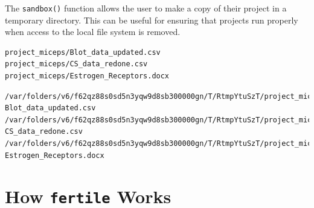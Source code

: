 \documentclass[12pt,twoside]{reedthesis}
\newenvironment{Shaded}{\begin{snugshade}}{\end{snugshade}}
\newcommand{\KeywordTok}[1]{\textcolor[rgb]{0.13,0.29,0.53}{\textbf{#1}}}
\newcommand{\DecValTok}[1]{\textcolor[rgb]{0.00,0.00,0.81}{#1}}
\newcommand{\StringTok}[1]{\textcolor[rgb]{0.31,0.60,0.02}{#1}}
\newcommand{\OperatorTok}[1]{\textcolor[rgb]{0.81,0.36,0.00}{\textbf{#1}}}
\newcommand{\NormalTok}[1]{#1}
\begin{document}
The \texttt{sandbox()} function allows the user to make a copy of their
project in a temporary directory. This can be useful for ensuring that
projects run properly when access to the local file system is removed.

\footnotesize
\begin{Shaded}
\end{Shaded}
\begin{verbatim}
project_miceps/Blot_data_updated.csv
project_miceps/CS_data_redone.csv
project_miceps/Estrogen_Receptors.docx
\end{verbatim}
\begin{Shaded}
\end{Shaded}
\begin{verbatim}
/var/folders/v6/f62qz88s0sd5n3yqw9d8sb300000gn/T/RtmpYtuSzT/project_miceps/
Blot_data_updated.csv
/var/folders/v6/f62qz88s0sd5n3yqw9d8sb300000gn/T/RtmpYtuSzT/project_miceps/
CS_data_redone.csv
/var/folders/v6/f62qz88s0sd5n3yqw9d8sb300000gn/T/RtmpYtuSzT/project_miceps/
Estrogen_Receptors.docx
\end{verbatim}
\normalsize

\section{\texorpdfstring{How \texttt{fertile}
Works}{How fertile Works}}\label{how-fertile-works}
\end{document}
